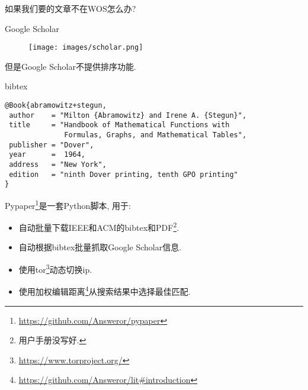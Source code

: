\documentclass[compress]{beamer}
\newcommand{\footurl}[1]{\footnote{\url{#1}}}
\begin{document}
\begin{frame}
    \begin{center}
    如果我们要的文章不在WOS怎么办?
    \end{center}
\end{frame}

\begin{frame}{Google Scholar}
    \begin{figure}
        \centering
        \texttt{[image: images/scholar.png]}
    \end{figure}
\end{frame}

\begin{frame}
    \begin{center}
    但是Google Scholar不提供排序功能.
    \end{center}
\end{frame}

\begin{frame}[fragile]{bibtex}
    \begin{listing}[H]
        \begin{verbatim}
@Book{abramowitz+stegun,
 author    = "Milton {Abramowitz} and Irene A. {Stegun}",
 title     = "Handbook of Mathematical Functions with
              Formulas, Graphs, and Mathematical Tables",
 publisher = "Dover",
 year      =  1964,
 address   = "New York",
 edition   = "ninth Dover printing, tenth GPO printing"
}
        \end{verbatim}
    \end{listing}
\end{frame}

\begin{frame}{\insertsubsection}
    Pypaper\footurl{https://github.com/Answeror/pypaper}是一套Python脚本, 用于:

    \begin{itemize}
        \item 自动批量下载IEEE和ACM的bibtex和PDF\footnote{用户手册没写好.}.
        \item 自动根据bibtex批量抓取Google Scholar信息.
    \end{itemize}
\end{frame}

\begin{frame}{\insertsubsection}
    \begin{itemize}[<+->]
        \item 使用tor\footurl{https://www.torproject.org/}动态切换ip.
        \item 使用加权编辑距离\footurl{https://github.com/Answeror/lit\#introduction}从搜索结果中选择最佳匹配.
    \end{itemize}
\end{frame}
\end{document}

